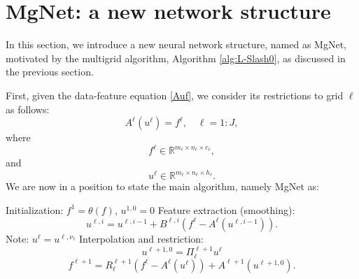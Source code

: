 \section{MgNet: a new network structure}\label{sec:mgnet}
In this section, we introduce a new neural network structure,
named as MgNet, motivated by the multigrid algorithm, 
Algorithm \ref{alg:L-Slash0}, as discussed in the previous section.


First, given the data-feature equation \eqref{Auf}, we consider
its restrictions to grid $\ell$ as follows:
\begin{equation}
\label{Auf-ell}
A^\ell(u^\ell) = f^\ell, \quad \ell=1:J,
\end{equation}
where
\begin{equation}
\label{f-ell}
f^{\ell}\in\mathbb R^{m_\ell\times n_\ell\times c_\ell},
\end{equation}
and 
\begin{equation}
\label{u-ell}
u^{\ell}\in\mathbb R^{m_\ell\times n_\ell\times h_\ell}.
\end{equation}
We are now in a position to state the main algorithm, namely
MgNet as:
\begin{breakablealgorithm}
	\caption{$u^J={\rm MgNet}(f; J,\nu_1, \cdots, \nu_J)$}
	\label{alg:mgnet}
	\begin{algorithmic}
		\State Initialization:  $f^1 =\theta(f)$, $u^{1,0}=0$
		\State Feature extraction (smoothing):
		\begin{equation}\label{mgnet}
		u^{\ell,i} = u^{\ell,i-1} + B^{\ell,i}  ({f^\ell -  A^{\ell} (u^{\ell,i-1})}).
		\end{equation}
		\EndFor
		\State Note: 
		$
		u^\ell= u^{\ell,\nu_\ell} 
		$
		\State Interpolation and restriction:
		\begin{equation}
		\label{interpolation}
		u^{\ell+1,0} = \Pi_\ell^{\ell+1}u^{\ell}
		\end{equation}
		\begin{equation}
		\label{restrict-f}
		f^{\ell+1} = R^{\ell+1}_\ell(f^\ell - A^\ell(u^{\ell})) + A^{\ell+1} (u^{\ell+1,0}).
		\end{equation}
		\EndFor
	\end{algorithmic}
\end{breakablealgorithm}


